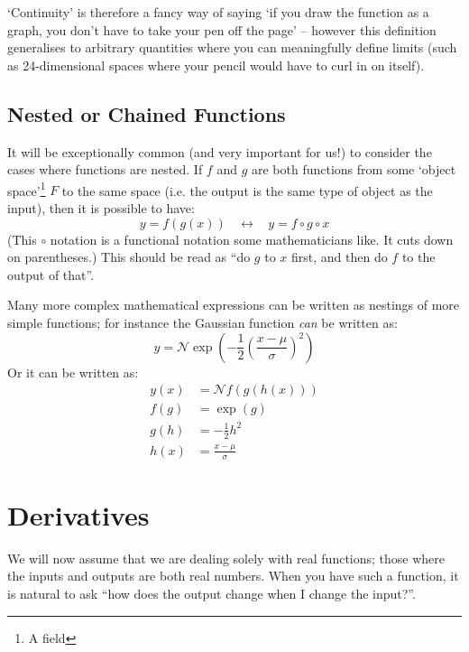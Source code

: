 \documentclass[a4paper,openany,11pt]{book}
\begin{document}
					`Continuity' is therefore a fancy way of saying `if you draw the function as a graph, you don't have to take your pen off the page' -- however this definition generalises to arbitrary quantities where you can meaningfully define limits (such as 24-dimensional spaces where your pencil would have to curl in on itself).

				\subsection{Nested or Chained Functions}

					It will be exceptionally common (and very important for us!) to consider the cases where functions are nested. If $f$ and $g$ are both functions from some `object space'\footnote{A field} $F$ to the same space (i.e. the output is the same type of object as the input), then it is possible to have:
					\begin{equation}
						y = f(g(x))~~~~ \leftrightarrow~~~~ y = f\circ g\circ x
					\end{equation}
					(This $\circ$ notation is a functional notation some mathematicians like. It cuts down on parentheses.) This should be read as ``do $g$ to $x$ first, and then do $f$ to the output of that''.

					Many more complex mathematical expressions can be written as nestings of more simple functions; for instance the Gaussian function \textit{can} be written as:
					\begin{equation}
						y = \mathcal{N} \exp\left(- \frac{1}{2} \left( \frac{x - \mu}{\sigma}\right)^2\right)
					\end{equation}
					Or it can be written as:
					\begin{align}
						y(x) & = \mathcal{N} f(g(h(x)))
						\\
						f(g) & = \exp(g)
						\\
						g(h) & = -\frac{1}{2} h^2
						\\
						h(x) & = \frac{x - \mu}{\sigma}
					\end{align}

			\section{Derivatives}

				We will now assume that we are dealing solely with real functions; those where the inputs and outputs are both real numbers. When you have such a function, it is natural to ask ``how does the output change when I change the input?''.
\end{document}
